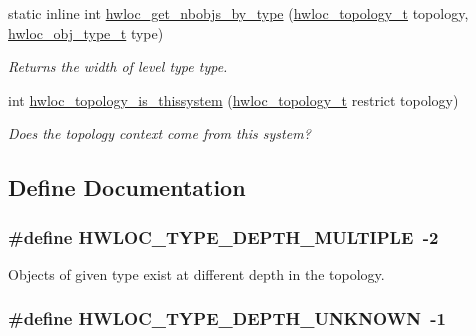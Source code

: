 \begin{DoxyCompactItemize}
static inline int \hyperlink{group__hwlocality__information_gad86a90c0d3501d90410fb1a4eb36f5d0}{hwloc\_\-get\_\-nbobjs\_\-by\_\-type} (\hyperlink{group__hwlocality__topology_ga9d1e76ee15a7dee158b786c30b6a6e38}{hwloc\_\-topology\_\-t} topology, \hyperlink{group__hwlocality__types_gacd37bb612667dc437d66bfb175a8dc55}{hwloc\_\-obj\_\-type\_\-t} type)
\begin{DoxyCompactList}\small\item\em Returns the width of level type {\ttfamily type}. \item\end{DoxyCompactList}\item 
int \hyperlink{group__hwlocality__information_ga29cdfde981aafc92eb89639a36b1ff9b}{hwloc\_\-topology\_\-is\_\-thissystem} (\hyperlink{group__hwlocality__topology_ga9d1e76ee15a7dee158b786c30b6a6e38}{hwloc\_\-topology\_\-t} restrict topology)
\begin{DoxyCompactList}\small\item\em Does the topology context come from this system? \item\end{DoxyCompactList}\end{DoxyCompactItemize}


\subsection{Define Documentation}
\hypertarget{group__hwlocality__information_ga64c80d3e0501b321d217b1642d68e23d}{
\subsubsection[{HWLOC\_\-TYPE\_\-DEPTH\_\-MULTIPLE}]{\setlength{\rightskip}{0pt plus 5cm}\#define HWLOC\_\-TYPE\_\-DEPTH\_\-MULTIPLE~-\/2}}
\label{group__hwlocality__information_ga64c80d3e0501b321d217b1642d68e23d}


Objects of given type exist at different depth in the topology. \hypertarget{group__hwlocality__information_ga9e86ce528f626330de2da7adb6c4e02e}{
\subsubsection[{HWLOC\_\-TYPE\_\-DEPTH\_\-UNKNOWN}]{\setlength{\rightskip}{0pt plus 5cm}\#define HWLOC\_\-TYPE\_\-DEPTH\_\-UNKNOWN~-\/1}}
\label{group__hwlocality__information_ga9e86ce528f626330de2da7adb6c4e02e}


